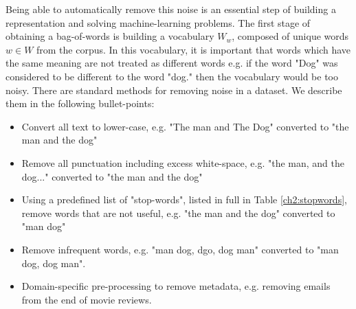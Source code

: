 
Being able to automatically remove this noise is an essential step of building a representation and solving machine-learning problems.  The first stage of obtaining a bag-of-words is building a vocabulary $W_w$, composed of unique words $w \in W$ from the corpus. In this vocabulary, it is important that words which have the same meaning are not treated as different words e.g. if the word "Dog" was considered to be different to the word "dog." then the vocabulary would be too noisy. There are standard methods for removing noise in a dataset. We describe them in the following bullet-points: %

\begin{itemize}
	\item  Convert all text to lower-case, e.g. "The man and The Dog" converted to "the man and the dog"
	\item  Remove all punctuation including excess white-space, e.g. "the man, and the dog..." converted to "the man and the dog"
	\item Using a predefined list of "stop-words", listed in full in Table \ref{ch2:stopwords}, remove words that are not useful, e.g. "the man and the dog" converted to "man dog"
	\item Remove infrequent words, e.g. "man dog, dgo, dog man" converted to "man dog, dog man".
	\item Domain-specific pre-processing to remove metadata, e.g. removing emails from the end of movie reviews.
\end{itemize}










